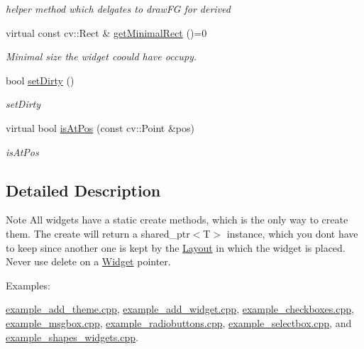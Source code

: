 \begin{DoxyCompactItemize}
\begin{DoxyCompactList}\small\item\em helper method which delgates to draw\+FG for derived \end{DoxyCompactList}\item 
virtual const cv\+::\+Rect \& \hyperlink{classcanvascv_1_1Widget_a5bae1daca295a6d7e2d1932d76529207}{get\+Minimal\+Rect} ()=0\hypertarget{classcanvascv_1_1Widget_a5bae1daca295a6d7e2d1932d76529207}{}\label{classcanvascv_1_1Widget_a5bae1daca295a6d7e2d1932d76529207}

\begin{DoxyCompactList}\small\item\em Minimal size the widget coould have occupy. \end{DoxyCompactList}\item 
bool \hyperlink{classcanvascv_1_1Widget_ac98faa983ed13b0394ec1542d89997eb}{set\+Dirty} ()
\begin{DoxyCompactList}\small\item\em set\+Dirty \end{DoxyCompactList}\item 
virtual bool \hyperlink{classcanvascv_1_1Widget_a3ea1ca9e064178a5647ce04bc531655f}{is\+At\+Pos} (const cv\+::\+Point \&pos)
\begin{DoxyCompactList}\small\item\em is\+At\+Pos \end{DoxyCompactList}\end{DoxyCompactItemize}


\subsection{Detailed Description}
\begin{DoxyNote}{Note}
All widgets have a static create methods, which is the only way to create them. The create will return a shared\+\_\+ptr$<$\+T$>$ instance, which you don\textquotesingle{}t have to keep since another one is kept by the \hyperlink{classcanvascv_1_1Layout}{Layout} in which the widget is placed. Never use delete on a \hyperlink{classcanvascv_1_1Widget}{Widget} pointer. 
\end{DoxyNote}
\begin{Desc}
\item[Examples\+: ]\par
\hyperlink{example_add_theme_8cpp-example}{example\+\_\+add\+\_\+theme.\+cpp}, \hyperlink{example_add_widget_8cpp-example}{example\+\_\+add\+\_\+widget.\+cpp}, \hyperlink{example_checkboxes_8cpp-example}{example\+\_\+checkboxes.\+cpp}, \hyperlink{example_msgbox_8cpp-example}{example\+\_\+msgbox.\+cpp}, \hyperlink{example_radiobuttons_8cpp-example}{example\+\_\+radiobuttons.\+cpp}, \hyperlink{example_selectbox_8cpp-example}{example\+\_\+selectbox.\+cpp}, and \hyperlink{example_shapes_widgets_8cpp-example}{example\+\_\+shapes\+\_\+widgets.\+cpp}.\end{Desc}


